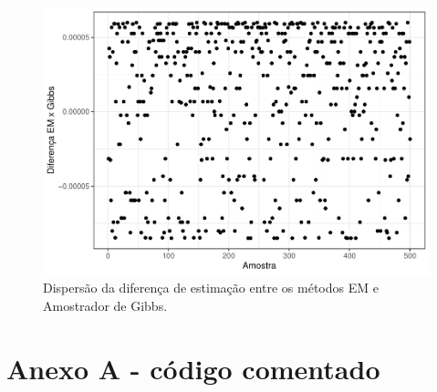\documentclass[
]{article}
\begin{document}
\begin{figure}

{\centering \includegraphics[width=0.6\linewidth]{relatorio_tp4_files/figure-latex/grafico-erros-1} 

}

\caption{Dispersão da diferença de estimação entre os métodos EM e Amostrador de Gibbs.}\label{fig:grafico-erros}
\end{figure}

\hypertarget{anexo-a---cuxf3digo-comentado}{%
\section*{Anexo A - código
comentado}\label{anexo-a---cuxf3digo-comentado}}
\end{document}
